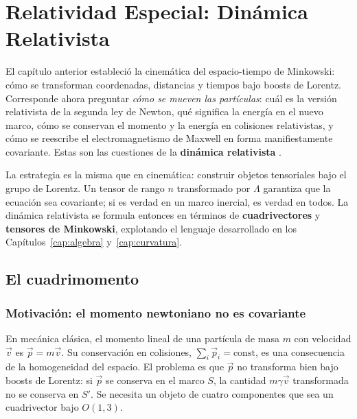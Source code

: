
\chapter{Relatividad Especial: Dinámica Relativista}
\label{cap:re_dinamica}

El capítulo anterior estableció la cinemática del espacio-tiempo de Minkowski: cómo se transforman coordenadas, distancias y tiempos bajo boosts de Lorentz. Corresponde ahora preguntar \emph{cómo se mueven las partículas}: cuál es la versión relativista de la segunda ley de Newton, qué significa la energía en el nuevo marco, cómo se conservan el momento y la energía en colisiones relativistas, y cómo se reescribe el electromagnetismo de Maxwell en forma manifiestamente covariante. Estas son las cuestiones de la \textbf{dinámica relativista} \cite{Carroll2004, Schutz2009, Misner1973, Jackson1999}.

La estrategia es la misma que en cinemática: construir objetos tensoriales bajo el grupo de Lorentz. Un tensor de rango $n$ transformado por $\Lambda$ garantiza que la ecuación sea covariante; si es verdad en un marco inercial, es verdad en todos. La dinámica relativista se formula entonces en términos de \textbf{cuadrivectores} y \textbf{tensores de Minkowski}, explotando el lenguaje desarrollado en los Capítulos~\ref{cap:algebra} y~\ref{cap:curvatura}.

\section{El cuadrimomento}

\subsection{Motivación: el momento newtoniano no es covariante}

En mecánica clásica, el momento lineal de una partícula de masa $m$ con velocidad $\vec{v}$ es $\vec{p} = m\vec{v}$. Su conservación en colisiones, $\sum_i \vec{p}_i = \text{const}$, es una consecuencia de la homogeneidad del espacio. El problema es que $\vec{p}$ no transforma bien bajo boosts de Lorentz: si $\vec{p}$ se conserva en el marco $S$, la cantidad $m\gamma\vec{v}$ transformada no se conserva en $S'$. Se necesita un objeto de cuatro componentes que sea un cuadrivector bajo $O(1,3)$.

